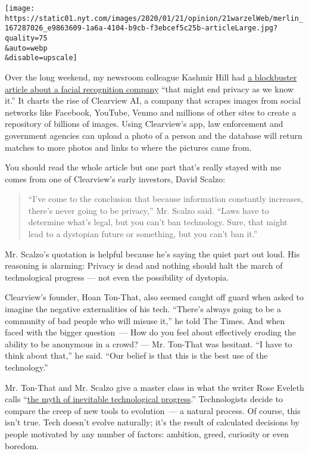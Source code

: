 \texttt{[image: https://static01.nyt.com/images/2020/01/21/opinion/21warzelWeb/merlin\_167287026\_e9863609-1a6a-4104-b9cb-f3ebcef5c25b-articleLarge.jpg?quality=75\\\&auto=webp\\\&disable=upscale]}

Over the long weekend, my newsroom colleague Kashmir Hill had
\href{https://www.nytimes.com/2020/01/18/technology/clearview-privacy-facial-recognition.html}{a
blockbuster article about a facial recognition company} ``that might end
privacy as we know it.'' It charts the rise of Clearview AI, a company
that scrapes images from social networks like Facebook, YouTube, Venmo
and millions of other sites to create a repository of billions of
images. Using Clearview's app, law enforcement and government agencies
can upload a photo of a person and the database will return matches to
more photos and links to where the pictures came from.

You should read the whole article but one part that's really stayed with
me comes from one of Clearview's early investors, David Scalzo:

\begin{quote}
``I've come to the conclusion that because information constantly
increases, there's never going to be privacy,'' Mr. Scalzo said. ``Laws
have to determine what's legal, but you can't ban technology. Sure, that
might lead to a dystopian future or something, but you can't ban it.''
\end{quote}

Mr. Scalzo's quotation is helpful because he's saying the quiet part out
loud. His reasoning is alarming: Privacy is dead and nothing should halt
the march of technological progress --- not even the possibility of
dystopia.

Clearview's founder, Hoan Ton-That, also seemed caught off guard when
asked to imagine the negative externalities of his tech. ``There's
always going to be a community of bad people who will misuse it,'' he
told The Times. And when faced with the bigger question~--- How do you
feel about effectively eroding the ability to be anonymous in a crowd?
--- Mr. Ton-That was hesitant. ``I have to think about that,'' he said.
``Our belief is that this is the best use of the technology.''

Mr. Ton-That and Mr. Scalzo give a master class in what the writer Rose
Eveleth calls
``\href{https://www.vox.com/the-highlight/2019/10/1/20887003/tech-technology-evolution-natural-inevitable-ethics}{the
myth of inevitable technological progress}.'' Technologists decide to
compare the creep of new tools to evolution~--- a natural process. Of
course, this isn't true. Tech doesn't evolve naturally; it's the result
of calculated decisions by people motivated by any number of factors:
ambition, greed, curiosity or even boredom.

